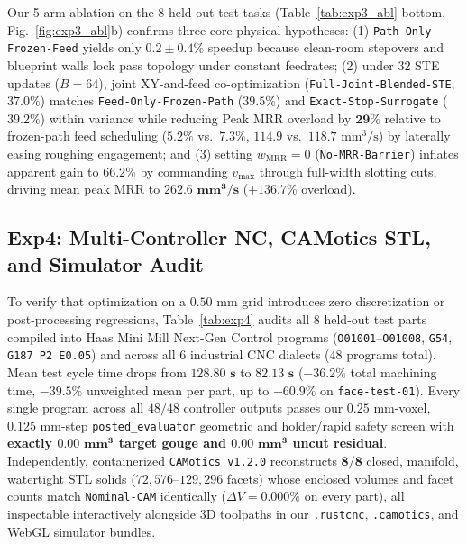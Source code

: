 \documentclass[conference]{IEEEtran}
\begin{document}
Our 5-arm ablation on the 8 held-out test tasks (Table~\ref{tab:exp3_abl} bottom, Fig.~\ref{fig:exp3_abl}b) confirms three core physical hypotheses: (1) \texttt{Path-Only-Frozen-Feed} yields only $\mathbf{0.2 \pm 0.4\%}$ speedup because clean-room stepovers and blueprint walls lock pass topology under constant feedrates; (2) under $32$ STE updates ($B=64$), joint XY-and-feed co-optimization (\texttt{Full-Joint-Blended-STE}, $37.0\%$) matches \texttt{Feed-Only-Frozen-Path} ($39.5\%$) and \texttt{Exact-Stop-Surrogate} ($39.2\%$) within variance while reducing Peak MRR overload by $\mathbf{29\%}$ relative to frozen-path feed scheduling ($\mathbf{5.2\%}$ vs.\ $7.3\%$, $114.9$ vs.\ $118.7\text{ mm}^3/\text{s}$) by laterally easing roughing engagement; and (3) setting $w_{\text{MRR}} = 0$ (\texttt{No-MRR-Barrier}) inflates apparent gain to $66.2\%$ by commanding $v_{\max}$ through full-width slotting cuts, driving mean peak MRR to $\mathbf{262.6\text{ mm}^3/\text{s}}$ ($\mathbf{+136.7\%}$ overload).

\subsection{Exp4: Multi-Controller NC, CAMotics STL, and Simulator Audit}
To verify that optimization on a $0.50\text{ mm}$ grid introduces zero discretization or post-processing regressions, Table~\ref{tab:exp4} audits all 8 held-out test parts compiled into Haas Mini Mill Next-Gen Control programs (\texttt{O01001}--\texttt{O01008}, \texttt{G54}, \texttt{G187 P2 E0.05}) and across all 6 industrial CNC dialects ($48$ programs total). Mean test cycle time drops from $\mathbf{128.80\text{ s}}$ to $\mathbf{82.13\text{ s}}$ ($\mathbf{-36.2\%}$ total machining time, $\mathbf{-39.5\%}$ unweighted mean per part, up to $\mathbf{-60.9\%}$ on \texttt{face-test-01}). Every single program across all $48/48$ controller outputs passes our $0.25\text{ mm}$-voxel, $0.125\text{ mm}$-step \texttt{posted\_evaluator} geometric and holder/rapid safety screen with \textbf{exactly $\mathbf{0.00\text{ mm}^3}$ target gouge and $\mathbf{0.00\text{ mm}^3}$ uncut residual}. Independently, containerized \texttt{CAMotics v1.2.0} reconstructs $\mathbf{8/8}$ closed, manifold, watertight STL solids ($72{,}576$--$129{,}296$ facets) whose enclosed volumes and facet counts match \texttt{Nominal-CAM} identically ($\Delta V = \mathbf{0.000\%}$ on every part), all inspectable interactively alongside 3D toolpaths in our \texttt{.rustcnc}, \texttt{.camotics}, and WebGL simulator bundles.
\end{document}
